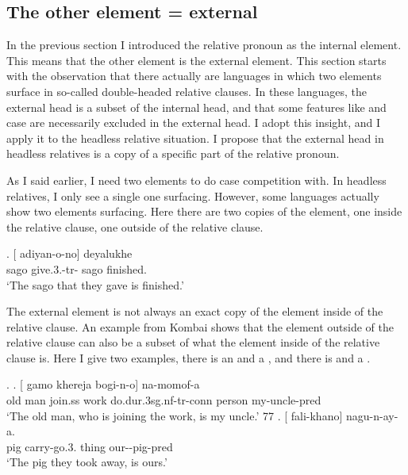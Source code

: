 \subsection{The other element = external}\label{sec:external-element}

In the previous section I introduced the relative pronoun as the internal element. This means that the other element is the external element. This section starts with the observation that there actually are languages in which two elements surface in so-called double-headed relative clauses. In these languages, the external head is a subset of the internal head, and that some features like  and case are necessarily excluded in the external head. I adopt this insight, and I apply it to the headless relative situation. I propose that the external head in headless relatives is a copy of a specific part of the relative pronoun.%

As I said earlier, I need two elements to do case competition with. In headless relatives, I only see a single one surfacing. However, some languages actually show two elements surfacing. Here there are two copies of the element, one inside the relative clause, one outside of the relative clause.

\exg. [ adiyan-o-no]  deyalukhe\\
 sago give.3.-{tr}- sago finished.\\
 `The sago that they gave is finished.' 

The external element is not always an exact copy of the element inside of the relative clause. An example from Kombai shows that the element outside of the relative clause can also be a subset of what the element inside of the relative clause is. Here I give two examples, there is an  and a , and there is  and a .

\ex.
\ag. [ gamo khereja bogi-n-o]  na-momof-a\\
 {old man} join.\ac{ss} work do.\ac{dur}.3\ac{sg}.\ac{nf}-\ac{tr}-\ac{conn} person my-uncle-\ac{pred}\\
 `The old man, who is joining the work, is my uncle.' 77
\bg. [ fali-khano]  nagu-n-ay-a.\\
 pig carry-go.3. thing our--pig-\ac{pred}\\
 `The pig they took away, is ours.' 

